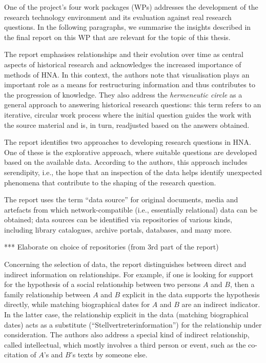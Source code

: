 One of the project's four work packages (WPs)
addresses the development of the research technology environment
and its evaluation against real research questions.
In the following paragraphs,
we summarise the insights described in the final report on this WP \autocite{Fangerau2022}
that are relevant for the topic of this thesis.

The report emphasises relationships and their evolution over time
as central aspects of historical research and acknowledges the increased 
importance of methods of HNA. In this context, the authors note that visualisation plays an important role
as a means for restructuring information and thus contributes to the progression of knowledge.
They also address the \emph{hermeneutic circle} \autocite{Malpas2015}
as a general approach to answering historical research questions:
this term refers to an iterative, circular work process
where the initial question guides the work with the source material
and is, in turn, readjusted based on the answers obtained.

The report identifies two approaches to developing research questions
in HNA. One of these is the explorative approach,
where suitable questions are developed based on the available data.
According to the authors, this approach includes serendipity,
i.e., the hope that an inspection of the data helps identify unexpected
phenomena that contribute to the shaping of the research question.

The report uses the term \enquote{data source} for original documents, media and artefacts
from which network-compatible (i.e., essentially relational) data can be obtained;
data sources can be identified via repositories of various kinds,
including library catalogues, archive portals, databases, and many more.

*** Elaborate on choice of repositories (from 3rd part of the report)

Concerning the selection of data, the report distinguishes between
direct and indirect information on relationships.
For example, if one is looking for support for the hypothesis of a social relationship
between two persons $A$ and $B$, then a family relationship between $A$ and $B$ explicit in the data
supports the hypothesis directly, while matching biographical dates for $A$ and $B$
are an indirect indicator. In the latter case, the relationship
explicit in the data (matching biographical dates) acts as a substitute
(\enquote{Stellvertreterinformation}) for the relationship under consideration.
The authors also address a special kind of indirect relationship,
called intellectual, which mostly involves a third person
or event, such as the co-citation of $A$'s and $B$'s texts by someone else.

